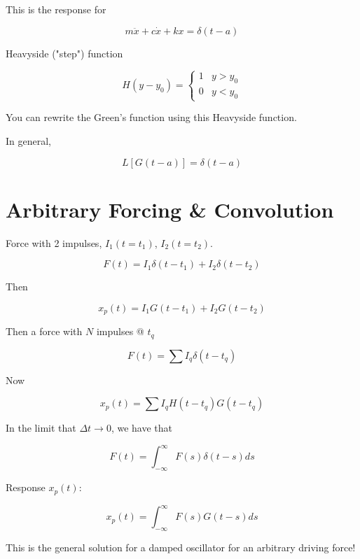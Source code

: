 \documentclass{article}
\newtheorem{one minute paper}[theorem]{One Minute Paper}
\begin{document}
This is the response for 

\begin{equation}
    m\ddot{x} + c\dot{x} + kx = \delta(t-a)
\end{equation}

Heavyside ("step") function 

\begin{equation}
    H(y-y_0) = \begin{cases}
        1 & y > y_0 \\
        0 & y < y_0
    \end{cases}
\end{equation}

You can rewrite the Green's function using this Heavyside function.

In general, 

\begin{equation}
    L[G(t-a)] = \delta(t-a)
\end{equation}

\section*{Arbitrary Forcing \& Convolution}

Force with 2 impulses, $I_1(t=t_1)$, $I_2(t=t_2)$. 

\begin{equation}
    F(t) = I_1\delta(t-t_1) + I_2\delta(t-t_2)
\end{equation}

Then 

\begin{equation}
    x_p(t) = I_1G(t - t_1) + I_2G(t-t_2)
\end{equation}

Then a force with $N$ impulses @ $t_q$

\begin{equation}
    F(t) = \sum I_q\delta(t-t_q)
\end{equation}

Now 

\begin{equation}
    x_p(t) = \sum I_qH(t-t_q)G(t-t_q)
\end{equation}

In the limit that $\Delta t \rightarrow 0$, we have that 

\begin{equation}
    F(t) = \int_{-\infty}^{\infty}F(s)\delta(t-s)ds
\end{equation}

Response $x_p(t)$:

\begin{equation}
    x_p(t) = \int_{-\infty}^{\infty}F(s)G(t-s)ds
\end{equation}

This is the general solution for a damped oscillator for an arbitrary driving force!
\end{document}

